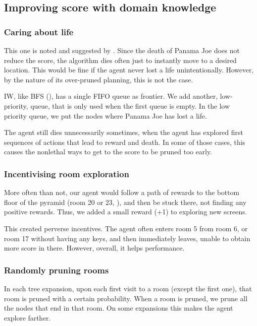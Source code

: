 \subsection{Improving score with domain knowledge\label{subsec:domain-explanation}}
\subsubsection{Caring about life}
This one is noted and suggested by \citet{lipovetzky2015classical}. Since the
death of Panama Joe does not reduce the score, the algorithm dies often just to
instantly move to a desired location. This would be fine if the agent never lost
a life unintentionally. However, by the nature of its over-pruned planning, this
is not the case.

\ac{IW}, like \ac{BFS} (), has a single \ac{FIFO} queue as
frontier. We add another, low-priority, queue, that is only used when
the first queue is empty. In the low priority queue, we put the nodes where
Panama Joe has lost a life.

The agent still dies unnecessarily sometimes, when the agent has explored first
sequences of actions that lead to reward and death. In some of those
cases, this causes the nonlethal ways to get to the score to be pruned too early.

\subsubsection{Incentivising room exploration}
More often than not, our agent would follow a path of rewards to the bottom
floor of the pyramid (room 20 or 23, ), and then be
stuck there, not finding any positive rewards. Thus, we added a small reward
(+1) to exploring new screens.

This created perverse incentives. The agent often enters room 5 from room 6, or
room 17 without having any keys, and then immediately leaves, unable to obtain
more score in there. However, overall, it helps performance.

\subsubsection{Randomly pruning rooms}
In each tree expansion, upon each first visit to a room (except the first one),
that room is pruned with a certain probability. When a room is pruned, we prune
all the nodes that end in that room. On some expansions this makes the agent
explore farther.


